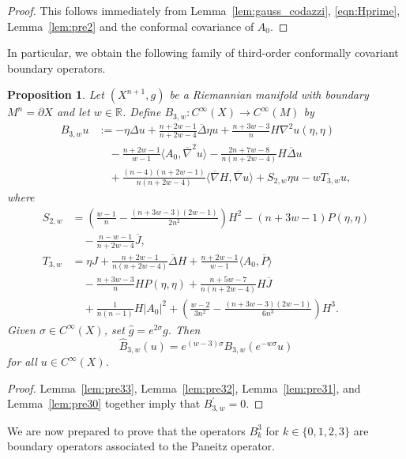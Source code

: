 \documentclass{amsart}
\newtheorem{prop}[thm]{Proposition}
\theoremstyle{definition}
\theoremstyle{remark}
\numberwithin{equation}{section}
\begin{document}
\begin{proof}
 This follows immediately from Lemma~\ref{lem:gauss_codazzi}, \eqref{eqn:Hprime}, Lemma~\ref{lem:pre2} and the conformal covariance of $A_0$.
\end{proof}

In particular, we obtain the following family of third-order conformally covariant boundary operators.

\begin{prop}
 \label{prop:oi3}
 Let $(X^{n+1},g)$ be a Riemannian manifold with boundary $M^n=\partial X$ and let $w\in{\mathbb{R}}$.  Define $B_{3,w}\colon C^\infty(X)\to C^\infty(M)$ by
 \begin{align*}
  B_{3,w}u & := -\eta\Delta u + \frac{n+2w-1}{n+2w-4}{\overline{\Delta}}\eta u + \frac{n+3w-3}{n}H\nabla^2u(\eta,\eta) \\
   & \quad - \frac{n+2w-1}{w-1}{\langle} A_0,{\overline{\nabla}}^2u{\rangle} - \frac{2n+7w-8}{n(n+2w-4)}H{\overline{\Delta}} u \\
   & \quad + \frac{(n-4)(n+2w-1)}{n(n+2w-4)}{\langle}{\overline{\nabla}} H,{\overline{\nabla}} u{\rangle} + S_{2,w}\eta u - wT_{3,w}u,
 \end{align*}
 where
 \begin{align*}
  S_{2,w} & = \left(\frac{w-1}{n} - \frac{(n+3w-3)(2w-1)}{2n^2}\right)H^2 - (n+3w-1)P(\eta,\eta) \\
   & \quad - \frac{n-w-1}{n+2w-4}{\overline{J}} , \\
  T_{3,w} & = \eta J + \frac{n+2w-1}{n(n+2w-4)}{\overline{\Delta}} H + \frac{n+2w-1}{w-1}{\langle} A_0,{\overline{P}}{\rangle} \\
   & \quad - \frac{n+3w-3}{n}HP(\eta,\eta) + \frac{n+5w-7}{n(n+2w-4)}H{\overline{J}} \\
   & \quad + \frac{1}{n(n-1)}H{\lvert} A_0{\rvert}^2 + \left(\frac{w-2}{3n^2}-\frac{(n+3w-3)(2w-1)}{6n^3}\right)H^3 .
 \end{align*}
 Given $\sigma\in C^\infty(X)$, set ${\widehat{g}}=e^{2\sigma}g$.  Then
 \[ {\widehat{B}}_{3,w}(u) = e^{(w-3)\sigma}B_{3,w}\left(e^{-w\sigma}u\right) \]
 for all $u\in C^\infty(X)$.
\end{prop}

\begin{proof}
 Lemma~\ref{lem:pre33}, Lemma~\ref{lem:pre32}, Lemma~\ref{lem:pre31}, and Lemma~\ref{lem:pre30} together imply that $B_{3,w}^\prime=0$.
\end{proof}

We are now prepared to prove that the operators $B_k^3$ for $k\in\{0,1,2,3\}$ are boundary operators associated to the Paneitz operator.
\end{document}
